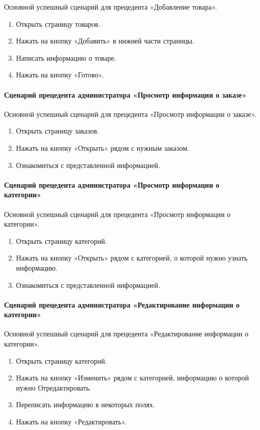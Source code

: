 Основной успешный сценарий для прецедента «Добавление товара».
\begin{enumerate}
	\item Открыть страницу товаров.
	\item Нажать на кнопку «Добавить» в нижней части страницы.
	\item Написать информацию о товаре.
	\item Нажать на кнопку «Готово».
\end{enumerate}

\paragraph{Сценарий прецедента администратора «Просмотр информации о заказе»}

Основной успешный сценарий для прецедента «Просмотр информации о заказе».
\begin{enumerate}
	\item Открыть страницу заказов.
	\item Нажать на кнопку «Открыть» рядом с нужным заказом.
	\item Ознакомиться с представленной информацией.
\end{enumerate}

\paragraph{Сценарий прецедента администратора «Просмотр информации о категории»}

Основной успешный сценарий для прецедента «Просмотр информации о категории».
\begin{enumerate}
	\item Открыть страницу категорий.
	\item Нажать на кнопку «Открыть» рядом с категорией, о которой нужно узнать информацию.
	\item Ознакомиться с представленной информацией.
\end{enumerate}

\paragraph{Сценарий прецедента администратора «Редактирование информации о категории»}

Основной успешный сценарий для прецедента «Редактирование информации о категории».
\begin{enumerate}
	\item Открыть страницу категорий.
	\item Нажать на кнопку «Изменить» рядом с категорией, информацию о которой нужно Отредактировать.
	\item Переписать информацию в некоторых полях.
	\item Нажать на кнопку «Редактировать».
\end{enumerate}

